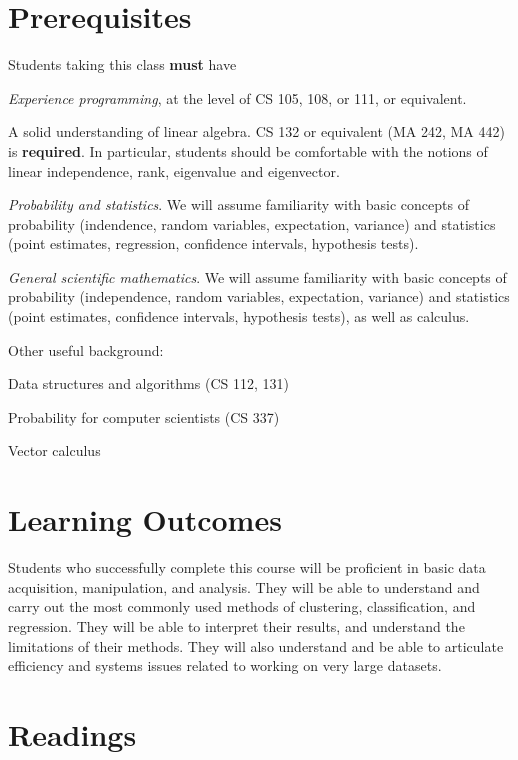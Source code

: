 \documentclass[11pt]{article}
\begin{document}
\section*{Prerequisites} 
Students taking this class \textbf{must} have 
\begin{compactitem}
  \item \emph{Experience programming}, at the level of CS 105, 108, or 111, or
  equivalent.  
\item A solid understanding of linear algebra. CS 132 or equivalent (MA 242, MA 442) is
  \textbf{required}. In particular, students should be comfortable with the notions
  of linear independence, rank,
  eigenvalue and eigenvector.
\item \emph{Probability and statistics}. We will assume familiarity
  with basic concepts of probability (indendence, random variables, expectation,
  variance) and statistics (point estimates, regression, confidence intervals,
  hypothesis tests).
\item \emph{General scientific mathematics}. We will assume familiarity
  with basic concepts of probability (independence, random variables, expectation,
  variance) and statistics (point estimates, confidence intervals,
  hypothesis tests), as well as calculus.

\end{compactitem}
\noindent Other useful background:
\begin{compactitem}
\item Data structures and algorithms (CS 112, 131)
\item Probability for computer scientists (CS 337)
\item Vector calculus
\end{compactitem}

\section*{Learning Outcomes}

Students who successfully complete this course will be proficient in
basic data acquisition, manipulation, and analysis.  They will be able
to understand and carry out the most commonly used methods of clustering,
classification, and regression. They will be able to interpret their
results, and understand the limitations of their methods. 
   They will also understand and be able to articulate 
efficiency and systems issues related to working on very large
datasets. 

\section*{Readings} 
\end{document}
